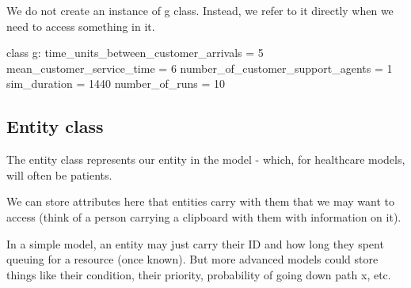 \documentclass[
  letterpaper,
  DIV=11,
  numbers=noendperiod]{scrreprt}
\newenvironment{Shaded}{\begin{snugshade}}{\end{snugshade}}
\newcommand{\DecValTok}[1]{\textcolor[rgb]{0.68,0.00,0.00}{#1}}
\newcommand{\KeywordTok}[1]{\textcolor[rgb]{0.00,0.23,0.31}{#1}}
\newcommand{\NormalTok}[1]{\textcolor[rgb]{0.00,0.23,0.31}{#1}}
\newcommand{\OperatorTok}[1]{\textcolor[rgb]{0.37,0.37,0.37}{#1}}
\begin{document}
We do not create an instance of g class. Instead, we refer to it
directly when we need to access something in it.

\begin{tcolorbox}[enhanced jigsaw, rightrule=.15mm, colback=white, colframe=quarto-callout-note-color-frame, colbacktitle=quarto-callout-note-color!10!white, toprule=.15mm, coltitle=black, opacityback=0, titlerule=0mm, bottomtitle=1mm, breakable, title=\textcolor{quarto-callout-note-color}{\faInfo}\hspace{0.5em}{Example g class}, opacitybacktitle=0.6, toptitle=1mm, arc=.35mm, bottomrule=.15mm, leftrule=.75mm, left=2mm]

\begin{Shaded}
\begin{Highlighting}[]
\KeywordTok{class}\NormalTok{ g:}
\NormalTok{    time\_units\_between\_customer\_arrivals }\OperatorTok{=} \DecValTok{5}
\NormalTok{    mean\_customer\_service\_time }\OperatorTok{=} \DecValTok{6}
\NormalTok{    number\_of\_customer\_support\_agents }\OperatorTok{=} \DecValTok{1}
\NormalTok{    sim\_duration }\OperatorTok{=} \DecValTok{1440}
\NormalTok{    number\_of\_runs }\OperatorTok{=} \DecValTok{10}
\end{Highlighting}
\end{Shaded}

\end{tcolorbox}

\subsection{Entity class}\label{entity-class}

The entity class represents our entity in the model - which, for
healthcare models, will often be patients.

We can store attributes here that entities carry with them that we may
want to access (think of a person carrying a clipboard with them with
information on it).

In a simple model, an entity may just carry their ID and how long they
spent queuing for a resource (once known). But more advanced models
could store things like their condition, their priority, probability of
going down path x, etc.
\end{document}
